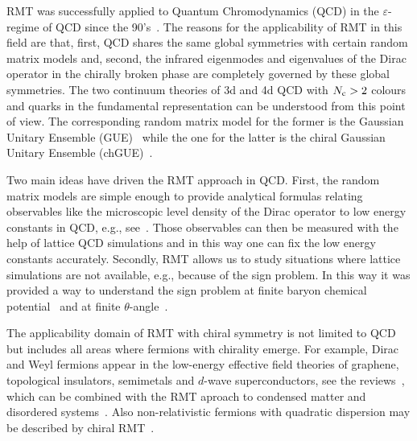 \documentclass[aps,prl,reprint,graphicx,showpacs]{revtex4-1}
\renewcommand{\epsilon}{\varepsilon}
\begin{document}
RMT was successfully applied to Quantum Chromodynamics (QCD) in the $\epsilon$-regime of QCD since the 90's~\cite{Shuryak:1992pi,Verbaarschot:1993pm,Verbaarschot:1994ip}. The reasons for the applicability of RMT in this field are that, first, QCD shares the same global symmetries with certain random matrix models and, second, the infrared eigenmodes and eigenvalues of the Dirac operator in the chirally broken phase are completely governed by these global symmetries. The two continuum theories of 3d and 4d QCD with $N_{\rm c}>2$ colours and quarks in the fundamental representation can be understood from this point of view. The corresponding random matrix model for the former is the Gaussian Unitary Ensemble (GUE)~\cite{Verbaarschot:1994ip} while the one for the latter is the chiral Gaussian Unitary Ensemble (chGUE)~\cite{Shuryak:1992pi,Verbaarschot:1993pm}.

Two main ideas have driven the RMT approach in QCD. First, the random matrix models are simple enough to provide analytical formulas relating observables like the microscopic level density of the Dirac operator to low energy constants in QCD, e.g., see~\cite{Verbaarschot:2000dy,Verbaarschot}. Those observables can then be measured with the help of lattice QCD simulations and in this way one can fix the low energy constants accurately. Secondly, RMT allows us to study situations where lattice simulations are not available, e.g., because of the sign problem. In this way it was provided a way to understand the sign problem at finite baryon chemical potential~\cite{Osborn:2004,Splittorff:2006vj,Akemann:2007rf,Kanazawa:2012zzr} and at finite $\theta$-angle~\cite{Damgaard:1999ij,Janik:1999,Kieburg:2017}.

 {  The applicability domain of RMT with chiral symmetry is not limited to QCD   
  but includes all areas where fermions with chirality emerge. 
  For example, Dirac and Weyl fermions appear in the low-energy effective
  field theories of graphene, topological insulators, semimetals and $d$-wave
  superconductors, see the reviews~\cite{dirfermrev}, which can be combined with the  RMT aproach to condensed matter and disordered systems~\cite{Beenakker}. Also non-relativistic fermions with quadratic dispersion may be described
  by chiral RMT~\cite{KanYam}.}
\end{document}
